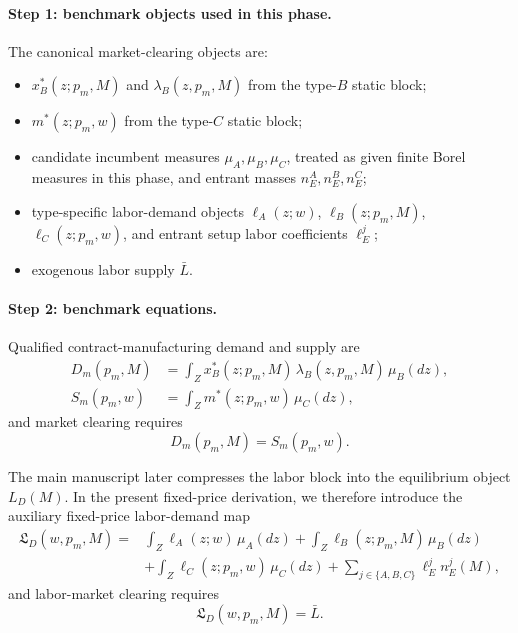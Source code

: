 \paragraph{Step 1: benchmark objects used in this phase.}
The canonical market-clearing objects are:
\begin{itemize}
    \item $x_B^*(z;p_m,M)$ and $\lambda_B(z,p_m,M)$ from the type-$B$ static block;
    \item $m^*(z;p_m,w)$ from the type-$C$ static block;
    \item candidate incumbent measures $\mu_A,\mu_B,\mu_C$, treated as given finite Borel measures in this phase, and entrant masses $n_E^A,n_E^B,n_E^C$;
    \item type-specific labor-demand objects $\ell_A(z;w)$, $\ell_B(z;p_m,M)$, $\ell_C(z;p_m,w)$, and entrant setup labor coefficients $\ell_E^j$;
    \item exogenous labor supply $\bar L$.
\end{itemize}

\paragraph{Step 2: benchmark equations.}
Qualified contract-manufacturing demand and supply are
\begin{align}
D_m(p_m,M)
&=\int_Z x_B^*(z;p_m,M)\,\lambda_B(z,p_m,M)\,\mu_B(dz),
\label{eq:p6_Dm}\\
S_m(p_m,w)
&=\int_Z m^*(z;p_m,w)\,\mu_C(dz),
\label{eq:p6_Sm}
\end{align}
and market clearing requires
\begin{equation}
D_m(p_m,M)=S_m(p_m,w).
\label{eq:p6_pm_clear}
\end{equation}

The main manuscript later compresses the labor block into the equilibrium object $L_D(M)$. In the present fixed-price derivation, we therefore introduce the auxiliary fixed-price labor-demand map
\begin{equation}
\begin{aligned}
\mathfrak L_D(w,p_m,M)={}&\int_Z \ell_A(z;w)\,\mu_A(dz)
+\int_Z \ell_B(z;p_m,M)\,\mu_B(dz)\\
&+\int_Z \ell_C(z;p_m,w)\,\mu_C(dz)
+\sum_{j\in\{A,B,C\}}\ell_E^j n_E^j(M),
\end{aligned}
\label{eq:p6_LD_aux}
\end{equation}
and labor-market clearing requires
\begin{equation}
\mathfrak L_D(w,p_m,M)=\bar L.
\label{eq:p6_labor_clear}
\end{equation}

